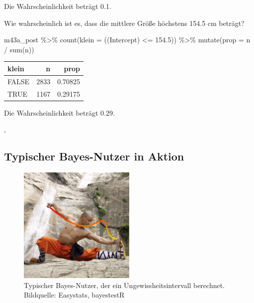 \documentclass[
  a4paper,
  DIV=11]{scrreprt}
\newenvironment{Shaded}{\begin{snugshade}}{\end{snugshade}}
\newcommand{\AttributeTok}[1]{\textcolor[rgb]{0.40,0.45,0.13}{#1}}
\newcommand{\FloatTok}[1]{\textcolor[rgb]{0.68,0.00,0.00}{#1}}
\newcommand{\FunctionTok}[1]{\textcolor[rgb]{0.28,0.35,0.67}{#1}}
\newcommand{\NormalTok}[1]{\textcolor[rgb]{0.00,0.23,0.31}{#1}}
\newcommand{\SpecialCharTok}[1]{\textcolor[rgb]{0.37,0.37,0.37}{#1}}
\newcommand{\StringTok}[1]{\textcolor[rgb]{0.13,0.47,0.30}{#1}}
\theoremstyle{definition}
\theoremstyle{remark}
\begin{document}
Die Wahrscheinlichkeit beträgt 0.1.

Wie wahrscheinlich ist es, dass die mittlere Größe höchstens 154.5 cm
beträgt?

\begin{Shaded}
\begin{Highlighting}[]
\NormalTok{m43a\_post }\SpecialCharTok{\%\textgreater{}\%} 
  \FunctionTok{count}\NormalTok{(}\AttributeTok{klein =}\NormalTok{ (}\StringTok{\textasciigrave{}}\AttributeTok{(Intercept)}\StringTok{\textasciigrave{}} \SpecialCharTok{\textless{}=} \FloatTok{154.5}\NormalTok{)) }\SpecialCharTok{\%\textgreater{}\%} 
  \FunctionTok{mutate}\NormalTok{(}\AttributeTok{prop =}\NormalTok{ n }\SpecialCharTok{/} \FunctionTok{sum}\NormalTok{(n))}
\end{Highlighting}
\end{Shaded}

\begin{longtable}[]{@{}lrr@{}}
\toprule()
klein & n & prop \\
\midrule()
\endhead
FALSE & 2833 & 0.70825 \\
TRUE & 1167 & 0.29175 \\
\bottomrule()
\end{longtable}

Die Wahrscheinlichkeit beträgt 0.29.

‚

\hypertarget{typischer-bayes-nutzer-in-aktion}{%
\subsection{Typischer Bayes-Nutzer in
Aktion}\label{typischer-bayes-nutzer-in-aktion}}

\begin{figure}

{\centering \includegraphics[width=0.5\textwidth,height=\textheight]{./img/bayesianMaster.jpg}

}

\caption{Typischer Bayes-Nutzer, der ein Ungewissheitsintervall
berechnet. Bildquelle: Easystats, bayestestR}

\end{figure}
\end{document}
